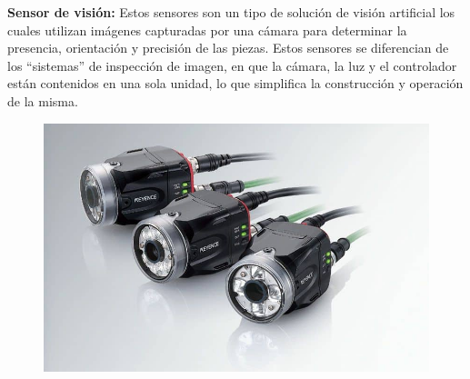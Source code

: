 \textbf{Sensor de visión: }
Estos sensores son un tipo de solución de visión artificial los cuales utilizan imágenes capturadas por una cámara para determinar la presencia, orientación y  precisión de las piezas. Estos sensores se diferencian de los “sistemas” de inspección de imagen, en que la cámara, la luz y el controlador están contenidos en una sola unidad, lo que simplifica la construcción y operación de la misma.

\begin{figure}[h]
	\centering
	\includegraphics[width=0.4\linewidth, height=0.2\textwidth]{img/vision}
	\caption{}
	\label{fig:vision}
\end{figure} 